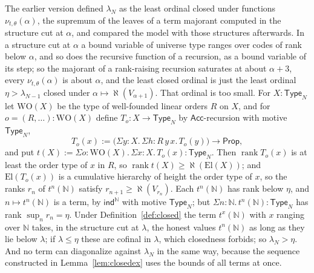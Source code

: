 \documentclass[10pt]{article}
\newcommand{\N}{\mathbb{N}}
\newcommand{\Prop}{\mathsf{Prop}}
\newcommand{\Type}{\mathsf{Type}}
\newcommand{\rk}{\operatorname{rank}}
\newcommand{\hartogs}{\aleph}
\newcommand{\El}{\mathrm{El}}
\begin{document}
\begin{example}\label{ex:sat}
The earlier version defined $\lambda_N$ as the least ordinal closed
under functions $\nu_{t,\theta}(\alpha)$, the supremum of the leaves of a
term majorant computed in the structure cut at $\alpha$, and compared
the model with those structures afterwards. In a structure cut at
$\alpha$ a bound variable of universe type ranges over codes of rank
below $\alpha$, and so does the recursive function of a recursion, as a
bound variable of its step; so the majorant of a rank-raising recursion
saturates at about $\alpha+3$, every $\nu_{t,\theta}(\alpha)$ is about
$\alpha$, and the least closed ordinal is just the least ordinal
$\eta>\lambda_{N-1}$ closed under $\alpha\mapsto\hartogs(V_{\alpha+1})$.
That ordinal is too small. For $X:\Type_N$ let $\mathrm{WO}(X)$ be the
type of well-founded linear orders $R$ on $X$, and for
$o=(R,\dots):\mathrm{WO}(X)$ define $T_o:X\to\Type_N$ by
$\mathsf{Acc}$-recursion with motive $\Type_N$,
\[
T_o(x):=\bigl(\Sigma y{:}X.\,\Sigma h{:}R\,y\,x.\,T_o(y)\bigr)\to\Prop ,
\]
and put $t(X):=\Sigma o{:}\mathrm{WO}(X).\,\Sigma x{:}X.\,T_o(x):\Type_N$.
Then $\rk T_o(x)$ is at least the order type of $x$ in $R$, so
$\rk t(X)\ge\hartogs(\El(X))$; and $\El(T_o(x))$ is a cumulative
hierarchy of height the order type of $x$, so the ranks $r_n$ of
$t^n(\N)$ satisfy $r_{n+1}\ge\hartogs(V_{r_n})$. Each $t^n(\N)$ has rank
below $\eta$, and $n\mapsto t^n(\N)$ is a term, by $\mathsf{ind}^\N$ with
motive $\Type_N$; but $\Sigma n{:}\N.\,t^n(\N):\Type_N$ has rank
$\sup_nr_n=\eta$. Under Definition~\ref{def:closed} the term $t^x(\N)$
with $x$ ranging over $\N$ takes, in the structure cut at $\lambda$,
the honest values $t^n(\N)$ as long as they lie below $\lambda$; if
$\lambda\le\eta$ these are cofinal in $\lambda$, which closedness
forbids; so $\lambda_N>\eta$. And
no term can diagonalize against $\lambda_N$ in the same way, because the
sequence constructed in Lemma~\ref{lem:closedex} uses the bounds of all
terms at once.
\end{example}
\end{document}
